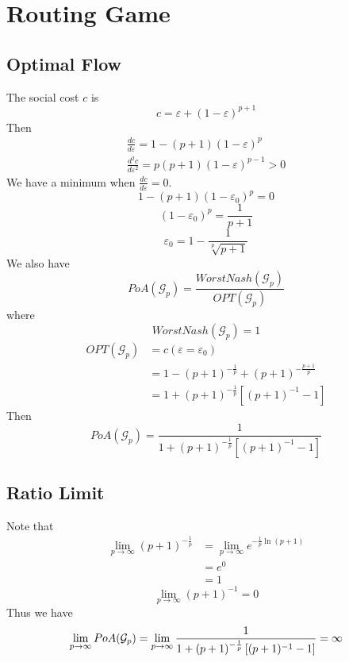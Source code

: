 \newpage
\section{Routing Game}

\subsection{Optimal Flow}
The social cost $c$ is
\[c=\varepsilon+(1-\varepsilon)^{p+1}\]
Then
\begin{equation}
\begin{aligned}
    \frac{dc}{d\varepsilon}=1-(p+1)(1-\varepsilon)^p\\
    \frac{d^2c}{d\varepsilon^2}=p(p+1)(1-\varepsilon)^{p-1} > 0
\end{aligned}
\end{equation}
We have a minimum when $\frac{dc}{d\varepsilon}=0$.
\[1-(p+1)(1-\varepsilon_0)^p=0\]
\[(1-\varepsilon_0)^p=\frac{1}{p+1}\]
\begin{equation}
    \varepsilon_0=1-\frac{1}{\sqrt[p]{p+1}}
\end{equation}
We also have
\[PoA(\mathcal{G}_p)=\frac{WorstNash(\mathcal{G}_p)}{OPT(\mathcal{G}_p)}\]
where
\[WorstNash(\mathcal{G}_p)=1\]
\begin{equation}
\begin{aligned}
    OPT(\mathcal{G}_p)&=c(\varepsilon=\varepsilon_0)\\
    &=1-(p+1)^{-\frac{1}{p}}+(p+1)^{-\frac{p+1}{p}}\\
    &=1+(p+1)^{-\frac{1}{p}}\left[(p+1)^{-1}-1\right]
\end{aligned}
\end{equation}
Then
\begin{equation}
    PoA(\mathcal{G}_p)
    =\frac{1}{1+(p+1)^{-\frac{1}{p}}\left[(p+1)^{-1}-1\right]}
\end{equation}
\subsection{Ratio Limit}
Note that
\begin{equation}
\begin{aligned}
    \lim_{p\rightarrow\infty}(p+1)^{-\frac{1}{p}}
    &=\lim_{p\rightarrow\infty}e^{-\frac{1}{p}\ln(p+1)}\\
    &=e^0\\
    &=1
\end{aligned}
\end{equation}
\begin{equation}
    \lim_{p\rightarrow\infty}(p+1)^{-1}=0
\end{equation}
Thus we have
\begin{equation}
    \lim_{p\rightarrow\infty}PoA(\mathcal{G}_p)
    =\lim_{p\rightarrow\infty}
    \frac{1}{1+(p+1)^{-\frac{1}{p}}\left[(p+1)^{-1}-1\right]}\\
    =\infty
\end{equation}


